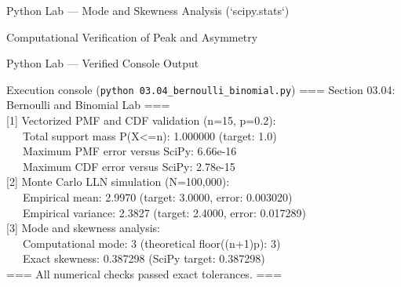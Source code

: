 \documentclass[aspectratio=169,xcolor={dvipsnames,table}]{beamer}
\begin{document}
\begin{frame}[fragile]{Python Lab --- Mode and Skewness Analysis (`scipy.stats`)}
	\begin{block}{Computational Verification of Peak and Asymmetry}
		
	\end{block}
\end{frame}


\begin{frame}[fragile]{Python Lab --- Verified Console Output}
	\begin{block}{Execution console (\texttt{python 03.04\_bernoulli\_binomial.py})}
		\fontsize{6pt}{7pt}\selectfont\ttfamily
=== Section 03.04: Bernoulli and Binomial Lab ===\\[0.08cm]
{[1]} Vectorized PMF and CDF validation (n=15, p=0.2):\\
\ \ \ Total support mass P(X<=n): 1.000000 (target: 1.0)\\
\ \ \ Maximum PMF error versus SciPy: 6.66e-16\\
\ \ \ Maximum CDF error versus SciPy: 2.78e-15\\[0.08cm]
{[2]} Monte Carlo LLN simulation (N=100,000):\\
\ \ \ Empirical mean: 2.9970 (target: 3.0000, error: 0.003020)\\
\ \ \ Empirical variance: 2.3827 (target: 2.4000, error: 0.017289)\\[0.08cm]
{[3]} Mode and skewness analysis:\\
\ \ \ Computational mode: 3 (theoretical floor((n+1)p): 3)\\
\ \ \ Exact skewness: 0.387298 (SciPy target: 0.387298)\\[0.08cm]
=== All numerical checks passed exact tolerances. ===
	\end{block}
\end{frame}
\end{document}
